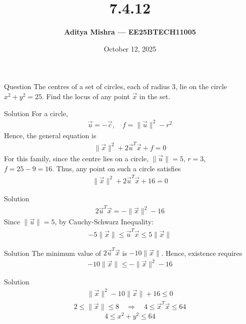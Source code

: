 \documentclass{beamer}
\title{\textbf{7.4.12}}
\author{\textbf{Aditya Mishra — EE25BTECH11005}}
\date{October 12, 2025}
\begin{document}
\begin{frame}
\titlepage
\end{frame}

\begin{frame}{Question}
The centres of a set of circles, each of radius \(3\), lie on the circle \(x^2 + y^2 = 25\).
Find the locus of any point \(\vec{x}\) in the set.
\end{frame}

\begin{frame}{Solution}
For a circle,
\begin{align}
\vec{u} = -\vec{c}, \quad f = \|\vec{u}\|^2 - r^2
\end{align}
Hence, the general equation is
\begin{align}
\|\vec{x}\|^2 + 2\vec{u}^T\vec{x} + f = 0
\end{align}
For this family, since the centre lies on a circle, $\|\vec{u}\|=5$, $r=3$, $f=25-9=16$. Thus, any point on such a circle satisfies
\begin{align}
\|\vec{x}\|^2 + 2\vec{u}^T\vec{x} + 16 = 0
\end{align}
\end{frame}

\begin{frame}{Solution}
\begin{align}
2\vec{u}^T\vec{x} = -\|\vec{x}\|^2 - 16
\end{align}
Since \(\|\vec{u}\| = 5\), by Cauchy-Schwarz Inequality:
\begin{align}
-5\|\vec{x}\| \le \vec{u}^T\vec{x} \le 5\|\vec{x}\|
\end{align}
\end{frame}

\begin{frame}{Solution}
The minimum value of \(2\vec{u}^T\vec{x}\) is \(-10\|\vec{x}\|\).  
Hence, existence requires
\begin{align}
-10\|\vec{x}\| \le -\|\vec{x}\|^2 - 16
\end{align}
\end{frame}

\begin{frame}{Solution}
\begin{align}
\|\vec{x}\|^2 - 10\|\vec{x}\| + 16 \le 0
\end{align}
\begin{align}
2 \le \|\vec{x}\| \le 8
\quad \Rightarrow \quad
4 \le \vec{x}^T\vec{x} \le 64
\end{align}
\[
\boxed{4 \le x^2 + y^2 \le 64}
\]
\end{frame}
\end{document}
